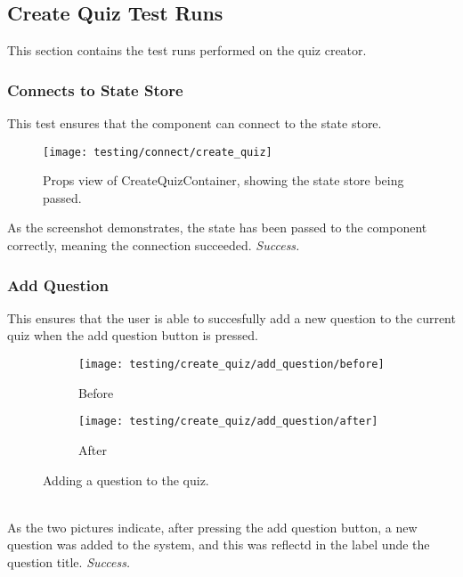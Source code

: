 \subsection{Create Quiz Test Runs} %
\label{sub:create_quiz_test}
This section contains the test runs performed on the quiz creator.

\subsubsection{Connects to State Store} %
\label{ssub:connects_to_state_store}
This test ensures that the component can connect to the state store.
\begin{figure}[h!]
  \texttt{[image: testing/connect/create\_quiz]}
  \caption{Props view of CreateQuizContainer, showing the state store being passed.}
\end{figure}
As the screenshot demonstrates, the state has been passed to the component correctly, meaning the connection succeeded. \textit{Success.}

\subsubsection{Add Question} %
\label{ssub:add_question}
This ensures that the user is able to succesfully add a new question to the current quiz when the add question button is pressed.
\begin{figure}[!htbp]
\centering
\begin{subfigure}{0.5\textwidth}
  \centering
  \texttt{[image: testing/create\_quiz/add\_question/before]}
  \caption{Before}
  \label{fig:sub1}
\end{subfigure}%
\begin{subfigure}{0.5\textwidth}
  \centering
  \texttt{[image: testing/create\_quiz/add\_question/after]}
  \caption{After}
  \label{fig:sub2}
\end{subfigure}
\caption{Adding a question to the quiz.}
\label{fig:test}
\end{figure}
\\As the two pictures indicate, after pressing the add question button, a new question was added to the system, and this was reflectd in the label unde the question title. \textit{Success.}

\clearpage

